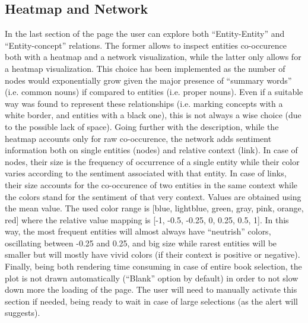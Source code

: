 \documentclass[sigchi]{article}
\begin{document}
\subsection{Heatmap and Network}
In the last section of the page the user can explore both “Entity-Entity” and “Entity-concept” relations.
The former allows to inspect entities co-occurence both with a heatmap and a network visualization, while the latter only allows for a heatmap visualization. This choice has been implemented as the number of nodes would exponentially grow given the major presence of “summary words” (i.e. common nouns) if compared to entities (i.e. proper nouns). Even if a suitable way was found to represent these relationships (i.e. marking concepts with a white border, and entities with a black one), this is not always a wise choice (due to the possible lack of space). Going further with the description, while the heatmap accounts only for raw co-occurence, the network adds sentiment information both on single entities (nodes) and relative context (link). In case of nodes, their size is the frequency of occurrence of a single entity while their color varies according to the sentiment associated with that entity.
In case of links, their size accounts for the co-occurence of two entities in the same context while the colors stand for the sentiment of that very context. Values are obtained using the mean value. The used color range is [blue, lightblue, green, gray, pink, orange, red] where the relative value  mapping is [-1, -0.5, -0.25, 0, 0.25, 0.5, 1]. In this way, the most frequent entities will almost always have “neutrish” colors, oscillating between -0.25 and 0.25, and big size while rarest entities will be smaller but will mostly have vivid colors (if their context is positive or negative).
Finally, being both rendering time consuming in case of entire book selection, the plot is not drawn automatically (“Blank” option by default) in order to not slow down more the loading of the page. The user will need to manually activate this section if needed, being ready to wait in case of large selections (as the alert will suggests).
\end{document}
